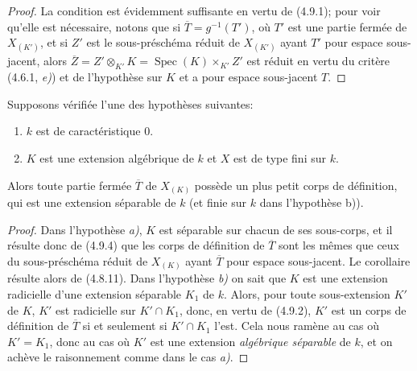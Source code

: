 \begin{proof}
La condition est évidemment suffisante en vertu de (4.9.1); pour voir qu'elle
est nécessaire, notons que si $\overline T=g^{-1}(T')$, où $T'$ est une
partie fermée de $X_{(K')}$, et si $Z'$ est le sous-préschéma réduit de
$X_{(K')}$ ayant $T'$ pour espace sous-jacent, alors
$\overline Z=Z'\otimes_{K'}K=\operatorname{Spec}(K)\times_{K'}Z'$ est réduit
en vertu du critère (4.6.1, \emph{e)}) et de l'hypothèse sur $K$ et a pour espace
sous-jacent $T$.
\end{proof}

\begin{corollary}[4.9.5]
\label{IV.2.4.9.5-fr}
Supposons vérifiée l'une des hypothèses suivantes:
\begin{enumerate}
\item[\textup{a)}] $k$ est de caractéristique $0$.
\item[\textup{b)}] $K$ est une extension algébrique de $k$ et $X$ est de type fini sur
$k$.
\end{enumerate}
Alors toute partie fermée $\overline T$ de $X_{(K)}$ possède un plus petit
corps de définition, qui est une extension séparable de $k$ (et finie sur $k$
dans l'hypothèse \textup{b))}.
\end{corollary}

\begin{proof}
Dans l'hypothèse \emph{a)}, $K$ est séparable sur chacun de ses sous-corps, et il
résulte donc de (4.9.4) que les corps de définition de $\overline T$ sont les
mêmes que ceux du sous-préschéma réduit de $X_{(K)}$ ayant $\overline T$ pour
espace sous-jacent. Le corollaire résulte alors de (4.8.11). Dans l'hypothèse
\emph{b)} on sait que $K$ est une extension radicielle d'une extension séparable
$K_1$ de $k$. Alors, pour toute sous-extension $K'$ de $K$, $K'$ est
radicielle sur $K'\cap K_1$, donc, en vertu de (4.9.2), $K'$ est un corps de
définition de $\overline T$ si et seulement si $K'\cap K_1$ l'est. Cela nous
ramène au cas où $K'=K_1$, donc au cas où $K'$ est une extension \emph{algébrique
séparable} de $k$, et on achève le raisonnement comme dans le cas \emph{a)}.
\end{proof}

